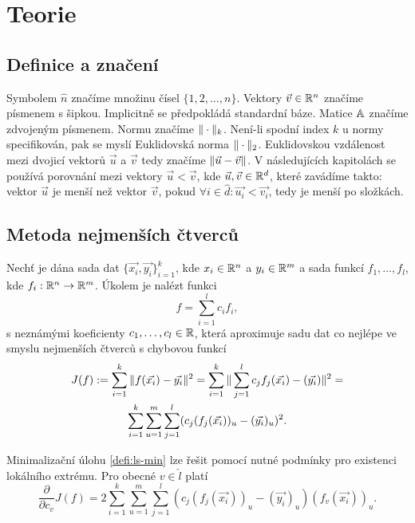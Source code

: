 \chapter{Teorie}

\section{Definice a značení}

Symbolem $\hat n$ značíme množinu čísel $\{1, 2, \ldots, n\}$. Vektory $\vec{v} \in \mathbb{R}^n$ značíme písmenem s šipkou. Implicitně se předpokládá standardní báze. Matice $\mathbb{A}$ značíme zdvojeným písmenem. Normu značíme $\|\cdot\|_k$. Není-li spodní index $k$ u normy specifikován, pak se myslí Euklidovská norma $\|\cdot\|_2$. Euklidovskou vzdálenost mezi dvojicí vektorů $\vec{u}$ a $\vec{v}$ tedy značíme $\|\vec{u} - \vec{v}\|$. V následujících kapitolách se používá porovnání mezi vektory $\vec{u} < \vec{v}$, kde $\vec{u}, \vec{v} \in \mathbb{R}^d$, které zavádíme takto: vektor $\vec{u}$ je menší než vektor $\vec{v}$, pokud $\forall i \in \hat{d}: \vec{u_i} < \vec{v_i}$, tedy je menší po složkách.

\section{Metoda nejmenších čtverců}

Nechť je dána sada dat $\{\vec{x_i}, \vec{y_i}\}_{i = 1}^k$, kde $x_i \in \mathbb{R}^n$ a $y_i \in \mathbb{R}^m$ a sada funkcí $f_1,\ldots,f_l$, kde $f_i: \mathbb{R}^n \rightarrow \mathbb{R}^m$. Úkolem je nalézt funkci
\begin{equation}
  \label{defi:ls}
  f = \sum_{i=1}^l c_if_i,
\end{equation}
s neznámými koeficienty $c_1,\ldots,c_l \in \mathbb{R}$, která aproximuje sadu dat co nejlépe ve smyslu nejmenších čtverců s chybovou funkcí
\begin{multline}
\label{defi:ls-min}
  J(f) := \sum_{i=1}^k \|f(\vec{x_i}) - \vec{y_i}\|^2 =
  \sum_{i=1}^k\|\sum_{j=1}^l c_jf_j(\vec{x_i}) - (\vec{y_i})\|^2 =\\
  \sum_{i=1}^k\sum_{u=1}^m\sum_{j=1}^l (c_j(f_j(\vec{x_i}))_u - (\vec{y_i})_u)^2.\\
\end{multline}

Minimalizační úlohu \ref{defi:ls-min} lze řešit pomocí nutné podmínky pro existenci lokálního extrému. Pro obecné $v \in \hat l$ platí
\begin{equation}
  \frac{\partial}{\partial c_v}J(f) = 2\sum_{i=1}^k\sum_{u=1}^m\sum_{j=1}^l(c_j(f_j(\vec{x_i}))_u - (\vec{y_i})_u)(f_v(\vec{x_i}))_u.
\end{equation}

